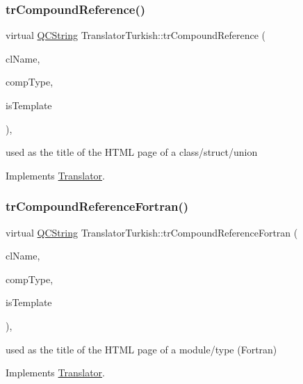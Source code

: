 \subsubsection{\texorpdfstring{trCompoundReference()}{trCompoundReference()}}
{\footnotesize\ttfamily virtual \mbox{\hyperlink{class_q_c_string}{Q\+C\+String}} Translator\+Turkish\+::tr\+Compound\+Reference (\begin{DoxyParamCaption}\item[{const char $\ast$}]{cl\+Name,  }\item[{\mbox{\hyperlink{class_class_def_ae70cf86d35fe954a94c566fbcfc87939}{Class\+Def\+::\+Compound\+Type}}}]{comp\+Type,  }\item[{bool}]{is\+Template }\end{DoxyParamCaption})\hspace{0.3cm}{\ttfamily [inline]}, {\ttfamily [virtual]}}

used as the title of the H\+T\+ML page of a class/struct/union 

Implements \mbox{\hyperlink{class_translator}{Translator}}.

\mbox{\label{class_translator_turkish_afa03258e526aa13d406a5f9cf649f3b6}} 
\subsubsection{\texorpdfstring{trCompoundReferenceFortran()}{trCompoundReferenceFortran()}}
{\footnotesize\ttfamily virtual \mbox{\hyperlink{class_q_c_string}{Q\+C\+String}} Translator\+Turkish\+::tr\+Compound\+Reference\+Fortran (\begin{DoxyParamCaption}\item[{const char $\ast$}]{cl\+Name,  }\item[{\mbox{\hyperlink{class_class_def_ae70cf86d35fe954a94c566fbcfc87939}{Class\+Def\+::\+Compound\+Type}}}]{comp\+Type,  }\item[{bool}]{is\+Template }\end{DoxyParamCaption})\hspace{0.3cm}{\ttfamily [inline]}, {\ttfamily [virtual]}}

used as the title of the H\+T\+ML page of a module/type (Fortran) 

Implements \mbox{\hyperlink{class_translator}{Translator}}.

